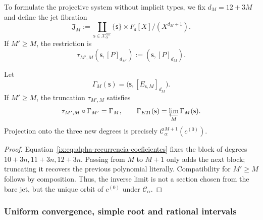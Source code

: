 To formulate the projective system without implicit types, we fix
\(d_M=12+3M\) and define the jet fibration
\begin{equation}
 \mathfrak J_M:=
 \coprod_{\mathsf s\in\mathcal X_\alpha^{\mathrm{enr}}}
 \{\mathsf s\}\times F_{\mathsf s}[X]/(X^{d_M+1}).
 \label{ix:eq:alpha-espacio-jets-rev08}
\end{equation}
If \(M'\ge M\), the restriction is
\begin{equation}
 \tau_{M',M}(\mathsf s,[P]_{d_{M'}})
 :=(\mathsf s,[P]_{d_M}).
 \label{ix:eq:alpha-truncamiento-jets-rev08}
\end{equation}

\begin{proposition}
\label{ix:prop:alpha-naturalidad-recurrencia-explicita}
Let
\[
 \Gamma_M(\mathsf s)
 =\bigl(\mathsf s,[E_{\mathsf s,M}]_{d_M}\bigr).
\]
If \(M'\geq M\), the truncation \(\tau_{M',M}\) satisfies
\begin{equation}
 \tau_{M',M}\circ\Gamma_{M'}=\Gamma_M,
 \qquad
 \Gamma_{E21}(\mathsf s)=\varprojlim_M\Gamma_M(\mathsf s).
 \label{ix:eq:alpha-naturalidad-explicita}
\end{equation}
Projection onto the three new degrees is precisely
\(\mathcal C_\alpha^{M+1}(c^{(0)})\).
\end{proposition}

\begin{proof}
Equation~\eqref{ix:eq:alpha-recurrencia-coeficientes} fixes the block of
degrees \(10+3n,11+3n,12+3n\). Passing from \(M\) to \(M+1\) only adds
the next block; truncating it recovers the previous polynomial literally.
Compatibility for \(M'\geq M\) follows by composition. Thus, the
inverse limit is not a section chosen from the bare jet, but the unique orbit
of \(c^{(0)}\) under \(\mathcal C_\alpha\).
\end{proof}

\subsubsection{Uniform convergence, simple root and rational intervals}
\label{ix:subsec:alpha-cotas-completas-rev08}


